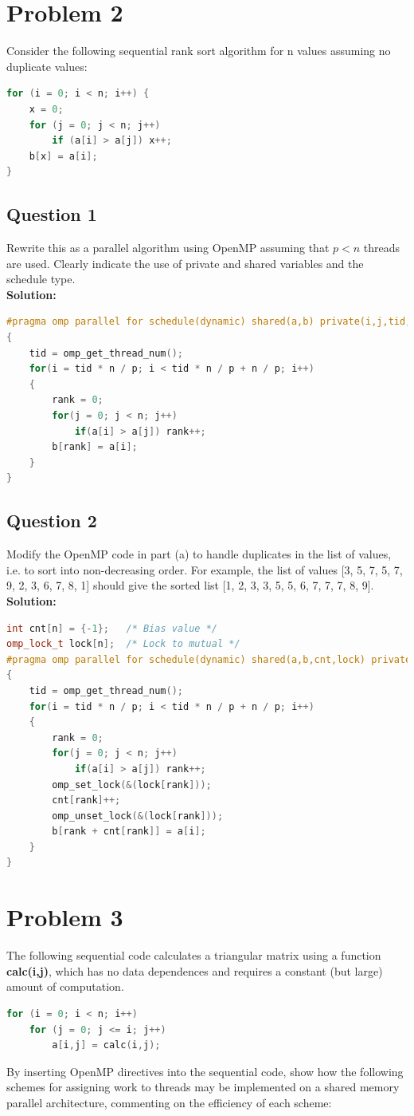 \documentclass{article}
\begin{document}
\section{Problem 2}
Consider the following sequential rank sort algorithm for n values assuming no 
duplicate values: 
\begin{lstlisting}[language=c++]
for (i = 0; i < n; i++) { 
    x = 0; 
    for (j = 0; j < n; j++) 
        if (a[i] > a[j]) x++; 
    b[x] = a[i]; 
} 
\end{lstlisting}
\subsection{Question 1}
Rewrite this as a parallel algorithm using OpenMP assuming that $p < n$ threads are used. Clearly indicate the use of private and shared variables and the schedule type.
\\\textbf{Solution: }
\begin{lstlisting}[language=c++]
#pragma omp parallel for schedule(dynamic) shared(a,b) private(i,j,tid,rank)
{
    tid = omp_get_thread_num();
    for(i = tid * n / p; i < tid * n / p + n / p; i++)
    {
        rank = 0;
        for(j = 0; j < n; j++)
            if(a[i] > a[j]) rank++;
        b[rank] = a[i];
    }
}
\end{lstlisting} 
\subsection{Question 2}
Modify the OpenMP code in part (a) to handle duplicates in the list of 
values, i.e. to sort into non-decreasing order. For example, the list of values 
[3, 5, 7, 5, 7, 9, 2, 3, 6, 7, 8, 1] should give the sorted list [1, 2, 3, 3, 5, 5, 6, 
7, 7, 7, 8, 9]. 
\\\textbf{Solution: }
\begin{lstlisting}[language=c++]
int cnt[n] = {-1};   /* Bias value */
omp_lock_t lock[n];  /* Lock to mutual */
#pragma omp parallel for schedule(dynamic) shared(a,b,cnt,lock) private(i,j,tid,rank)
{
    tid = omp_get_thread_num();
    for(i = tid * n / p; i < tid * n / p + n / p; i++)
    {
        rank = 0;
        for(j = 0; j < n; j++)
            if(a[i] > a[j]) rank++;
        omp_set_lock(&(lock[rank]));
        cnt[rank]++;
        omp_unset_lock(&(lock[rank]));
        b[rank + cnt[rank]] = a[i];
    }
}
\end{lstlisting} 

\pagebreak

\section{Problem 3}
The following sequential code calculates a triangular matrix using a function \textbf{calc(i,j)}, which has no data dependences and requires a constant (but large) amount of computation. 
\begin{lstlisting}[language=c++]
for (i = 0; i < n; i++) 
    for (j = 0; j <= i; j++) 
        a[i,j] = calc(i,j);
\end{lstlisting}
By inserting OpenMP directives into the sequential code, show how the 
following schemes for assigning work to threads may be implemented on a 
shared memory parallel architecture, commenting on the efficiency of each 
scheme: 
\end{document}
